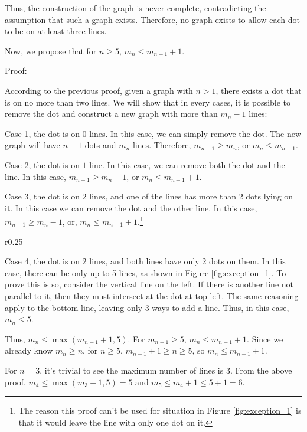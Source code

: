 \documentclass[a4paper, 12pt]{article}
\begin{document}
Thus, the construction of the graph is never complete, contradicting the assumption that such a graph exists. Therefore, no graph exists to allow each dot to be on at least three lines.


Now, we propose that for $n\geq5$, $m_n\leq m_{n-1}+1$.

Proof:

According to the previous proof, given a graph with $n>1$, there exists a dot that is on no more than two lines. We will show that in every cases, it is possible to remove the dot and construct a new graph with more than $m_{n}-1$ lines:

Case 1, the dot is on $0$ lines. In this case, we can simply remove the dot. The new graph will have $n-1$ dots and $m_n$ lines. Therefore, $m_{n-1}\geq m_{n}$, or $m_{n}\leq m_{n-1}$.

Case 2, the dot is on $1$ line. In this case, we can remove both the dot and the line. In this case, $m_{n-1}\geq m_{n}-1$, or $m_{n}\leq m_{n-1}+1$.

Case 3, the dot is on $2$ lines, and one of the lines has more than 2 dots lying on it. In this case we can remove the dot and the other line. In this case, $m_{n-1}\geq m_{n}-1$, or, $m_{n}\leq m_{n-1}+1$.\footnote{The reason this proof can't be used for situation in Figure \ref{fig:exception_1} is that it would leave the line with only one dot on it.}

\begin{wrapfigure}{r}{0.25\textwidth}
    \vspace{-0.5\baselineskip}
    
    \caption{3 potential lines when both line have only 2 dots}
    \label{fig:exception_1}
    \vspace{-1\baselineskip}
\end{wrapfigure}
 Case 4, the dot is on $2$ lines, and both lines have only 2 dots on them. In this case, there can be only up to 5 lines, as shown in Figure \ref{fig:exception_1}. To prove this is so, consider the vertical line on the left. If there is another line not parallel to it, then they must intersect at the dot at top left. The same reasoning apply to the bottom line, leaving only 3 ways to add a line. Thus, in this case, $m_{n}\leq{5}$.

Thus, $m_{n}\leq\max(m_{n-1}+1,5)$. For $m_{n-1}\geq5$, $m_n\leq m_{n-1}+1$.
Since we already know $m_n\geq n$, for $n\geq5$, $m_{n-1}+1\geq n\ge5$, so $m_n\leq m_{n-1}+1$.

For $n=3$, it's trivial to see the maximum number of lines is $3$. From the above proof, $m_4\leq\max(m_3+1,5)=5$ and $m_5\leq m_4+1\leq 5+1=6$.
\end{document}
